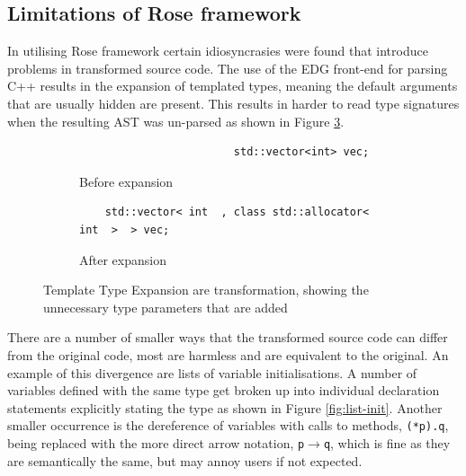 \documentclass[bsc,frontabs,singlespacing,twoside,parskip,deptreport]{infthesis}
\begin{document}



\subsection{Limitations of Rose framework}

In utilising Rose framework certain idiosyncrasies were found that introduce problems in transformed source code. The use of the EDG front-end for parsing C++ results in the expansion of templated types, meaning the default arguments that are usually hidden are present. This results in harder to read type signatures when the resulting AST was un-parsed as shown in Figure \ref{fig:temp-expand}. 

\begin{figure}[H]
    \centering
    \begin{subfigure}[h]{\textwidth}
        \centering
        \begin{verbatim}
                        std::vector<int> vec;
        \end{verbatim}
        \caption{Before expansion}
        \label{fig:temp-expand-before}
        \vspace{0.40cm}
    \end{subfigure}
    \begin{subfigure}[h]{\textwidth}
        \centering
        \begin{verbatim}
    std::vector< int  , class std::allocator< int  >  > vec;
        \end{verbatim}
        \caption{After expansion}
        \label{fig:temp-expand-after}
    \end{subfigure}
    \caption{Template Type Expansion are transformation, showing the unnecessary type parameters that are added}
    \label{fig:temp-expand}
\end{figure}

There are a number of smaller ways that the transformed source code can differ from the original code, most are harmless and are equivalent to the original. An example of this divergence are lists of variable initialisations. A number of variables defined with the same type get broken up into individual declaration statements explicitly stating the type as shown in Figure \ref{fig:list-init}. Another smaller occurrence is the dereference of variables with calls to methods, \texttt{(*p).q}, being replaced with the more direct arrow notation, \texttt{p$\rightarrow$q}, which is fine as they are semantically the same, but may annoy users if not expected. 
\end{document}
